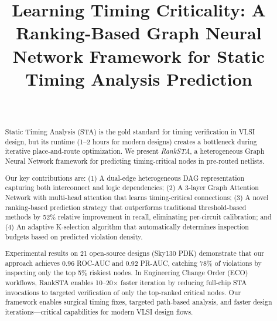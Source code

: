 \documentclass[10pt,twocolumn,journal]{IEEEtran}
\begin{document}
\title{Learning Timing Criticality: A Ranking-Based Graph Neural Network Framework for Static Timing Analysis Prediction}

\author{\\
}

\maketitle

\begin{abstract}
Static Timing Analysis (STA) is the gold standard for timing verification in VLSI design, but its runtime (1--2 hours for modern designs) creates a bottleneck during iterative place-and-route optimization. We present \textit{RankSTA}, a heterogeneous Graph Neural Network framework for predicting timing-critical nodes in pre-routed netlists.

Our key contributions are: (1) A dual-edge heterogeneous DAG representation capturing both interconnect and logic dependencies; (2) A 3-layer Graph Attention Network with multi-head attention that learns timing-critical connections; (3) A novel ranking-based prediction strategy that outperforms traditional threshold-based methods by 52\% relative improvement in recall, eliminating per-circuit calibration; and (4) An adaptive K-selection algorithm that automatically determines inspection budgets based on predicted violation density.

Experimental results on 21 open-source designs (Sky130 PDK) demonstrate that our approach achieves 0.96 ROC-AUC and 0.92 PR-AUC, catching 78\% of violations by inspecting only the top 5\% riskiest nodes. In Engineering Change Order (ECO) workflows, RankSTA enables 10--20$\times$ faster iteration by reducing full-chip STA invocations to targeted verification of only the top-ranked critical nodes. Our framework enables surgical timing fixes, targeted path-based analysis, and faster design iterations---critical capabilities for modern VLSI design flows.
\end{abstract}
\end{document}
